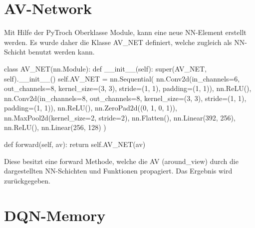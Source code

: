 \section{AV-Network} \label{sec:Anhang_AV_Network}
Mit Hilfe der PyTroch Oberklasse Module, kann eine neue NN-Element erstellt werden.
Es wurde daher die Klasse AV\_NET definiert, welche zugleich als NN-Schicht benutzt werden kann.
\begin{python}
	class AV_NET(nn.Module):
		def __init__(self):
			super(AV_NET, self).__init__()
			self.AV_NET = nn.Sequential(
			nn.Conv2d(in_channels=6, out_channels=8, kernel_size=(3, 3), stride=(1, 1), padding=(1, 1)),
			nn.ReLU(),
			nn.Conv2d(in_channels=8, out_channels=8, kernel_size=(3, 3), stride=(1, 1), padding=(1, 1)),
			nn.ReLU(),
			nn.ZeroPad2d((0, 1, 0, 1)),
			nn.MaxPool2d(kernel_size=2, stride=2),
			nn.Flatten(),
			nn.Linear(392, 256),
			nn.ReLU(),
			nn.Linear(256, 128)
			)
	
		def forward(self, av):
			return self.AV_NET(av)
\end{python}
Diese besitzt eine forward Methode, welche die AV (around\_view) durch die dargestellten NN-Schichten und Funktionen propagiert. Das Ergebnis wird zurückgegeben.

\section{DQN-Memory}


